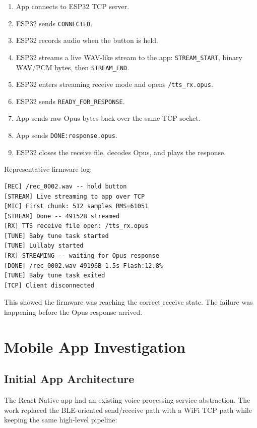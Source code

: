 \documentclass[11pt,a4paper]{article}
\begin{document}
\begin{enumerate}[leftmargin=*]
  \item App connects to ESP32 TCP server.
  \item ESP32 sends \texttt{CONNECTED}.
  \item ESP32 records audio when the button is held.
  \item ESP32 streams a live WAV-like stream to the app:
    \texttt{STREAM\_START}, binary WAV/PCM bytes, then \texttt{STREAM\_END}.
  \item ESP32 enters streaming receive mode and opens \texttt{/tts\_rx.opus}.
  \item ESP32 sends \texttt{READY\_FOR\_RESPONSE}.
  \item App sends raw Opus bytes back over the same TCP socket.
  \item App sends \texttt{DONE:response.opus}.
  \item ESP32 closes the receive file, decodes Opus, and plays the response.
\end{enumerate}

Representative firmware log:

\begin{lstlisting}[style=logstyle]
[REC] /rec_0002.wav -- hold button
[STREAM] Live streaming to app over TCP
[MIC] First chunk: 512 samples RMS=61051
[STREAM] Done -- 49152B streamed
[RX] TTS receive file open: /tts_rx.opus
[TUNE] Baby tune task started
[TUNE] Lullaby started
[RX] STREAMING -- waiting for Opus response
[DONE] /rec_0002.wav 49196B 1.5s Flash:12.8%
[TUNE] Baby tune task exited
[TCP] Client disconnected
\end{lstlisting}

This showed the firmware was reaching the correct receive state. The failure was happening before the Opus response arrived.

\section{Mobile App Investigation}

\subsection{Initial App Architecture}

The React Native app had an existing voice-processing service abstraction. The work replaced the BLE-oriented send/receive path with a WiFi TCP path while keeping the same high-level pipeline:
\end{document}
